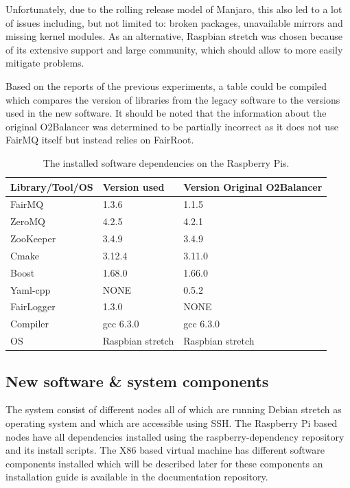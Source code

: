 \documentclass[]{article}
\begin{document}
Unfortunately, due to the rolling release model of Manjaro, this also led to a lot of issues including, but not limited to: broken packages, unavailable mirrors and missing kernel modules. As an alternative, Raspbian stretch was chosen because of its extensive support and large community, which should allow to more easily mitigate problems. 

Based on the reports of the previous experiments, a table could be compiled which compares the version of libraries from the legacy software to the versions used in the new software. It should be noted that the information about the original O2Balancer was determined to be partially incorrect as it does not use FairMQ itself but instead relies on FairRoot.

\begin{table}[H]
	\begin{center}
		\begin{tabular}{ | l | l | l | }
			\hline			
			\textbf{Library/Tool/OS} & \textbf{Version used} & \textbf{Version Original O2Balancer} \\ \hline
			
			FairMQ & 1.3.6 & 1.1.5 \\ \hline
			ZeroMQ & 4.2.5 & 4.2.1 \\ \hline
			ZooKeeper & 3.4.9 & 3.4.9 \\ \hline
			Cmake & 3.12.4 & 3.11.0 \\ \hline
			Boost & 1.68.0 & 1.66.0 \\ \hline
			Yaml-cpp & NONE & 0.5.2 \\ \hline
			FairLogger & 1.3.0 & NONE \\ \hline
			Compiler & gcc 6.3.0 & gcc 6.3.0 \\	\hline
			OS & Raspbian stretch & Raspbian stretch \\ \hline
		\end{tabular}
		\caption{The installed software dependencies on the Raspberry Pis.}
		\label{tab:librabies}
	\end{center}
\end{table}

\subsection{New software \& system components}
The system consist of different nodes all of which are running Debian stretch as operating system and which are accessible using SSH. The Raspberry Pi based nodes have all dependencies installed using the raspberry-dependency repository and its install scripts. The X86 based virtual machine has different software components installed which will be described later for these components an installation guide is available in the documentation repository.
\end{document}
